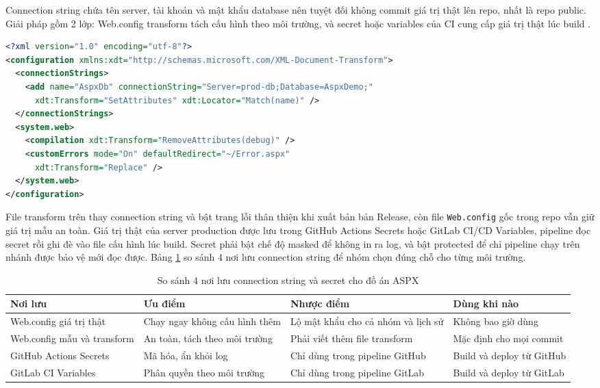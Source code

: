 Connection string chứa tên server, tài khoản và mật khẩu database nên tuyệt đối không commit giá trị thật lên repo, nhất là repo public.
Giải pháp gồm 2 lớp: Web.config transform tách cấu hình theo môi trường, và secret hoặc variables của CI cung cấp giá trị thật lúc build \cite{msnetfx,ghactions,gitlabci}.

\begin{lstlisting}[language=XML, caption={Vi du Web Release config thay connection string khi xuat ban}, label={lst:c7-transform}]
<?xml version="1.0" encoding="utf-8"?>
<configuration xmlns:xdt="http://schemas.microsoft.com/XML-Document-Transform">
  <connectionStrings>
    <add name="AspxDb" connectionString="Server=prod-db;Database=AspxDemo;"
      xdt:Transform="SetAttributes" xdt:Locator="Match(name)" />
  </connectionStrings>
  <system.web>
    <compilation xdt:Transform="RemoveAttributes(debug)" />
    <customErrors mode="On" defaultRedirect="~/Error.aspx"
      xdt:Transform="Replace" />
  </system.web>
</configuration>
\end{lstlisting}

File transform trên thay connection string và bật trang lỗi thân thiện khi xuất bản bản Release, còn file \texttt{Web.config} gốc trong repo vẫn giữ giá trị mẫu an toàn.
Giá trị thật của server production được lưu trong GitHub Actions Secrets hoặc GitLab CI/CD Variables, pipeline đọc secret rồi ghi đè vào file cấu hình lúc build.
Secret phải bật chế độ masked để không in ra log, và bật protected để chỉ pipeline chạy trên nhánh được bảo vệ mới đọc được.
Bảng \ref{tab:c7-secret} so sánh 4 nơi lưu connection string để nhóm chọn đúng chỗ cho từng môi trường.

\begin{table}[H]
\centering
\caption{So sánh 4 nơi lưu connection string và secret cho đồ án ASPX}
\label{tab:c7-secret}
\begin{tabular}{llll}
\toprule
Nơi lưu & Ưu điểm & Nhược điểm & Dùng khi nào \\
\midrule
Web.config giá trị thật & Chạy ngay không cấu hình thêm & Lộ mật khẩu cho cả nhóm và lịch sử & Không bao giờ dùng \\
Web.config mẫu và transform & An toàn, tách theo môi trường & Phải viết thêm file transform & Mặc định cho mọi commit \\
GitHub Actions Secrets & Mã hóa, ẩn khỏi log & Chỉ dùng trong pipeline GitHub & Build và deploy từ GitHub \\
GitLab CI Variables & Phân quyền theo môi trường & Chỉ dùng trong pipeline GitLab & Build và deploy từ GitLab \\
\bottomrule
\end{tabular}
\end{table}

